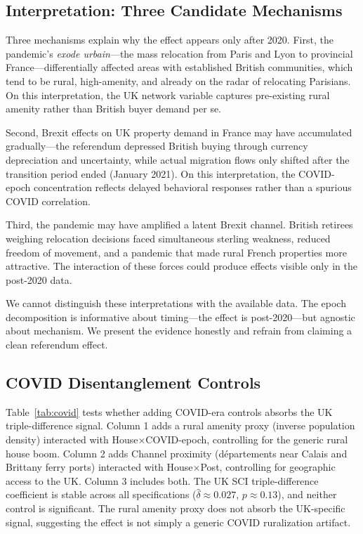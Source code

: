 \documentclass[12pt]{article}
\begin{document}
{\footnotesize}

\subsection{Interpretation: Three Candidate Mechanisms}

Three mechanisms explain why the effect appears only after 2020. First, the pandemic's \textit{exode urbain}---the mass relocation from Paris and Lyon to provincial France---differentially affected areas with established British communities, which tend to be rural, high-amenity, and already on the radar of relocating Parisians. On this interpretation, the UK network variable captures pre-existing rural amenity rather than British buyer demand per se.

Second, Brexit effects on UK property demand in France may have accumulated gradually---the referendum depressed British buying through currency depreciation and uncertainty, while actual migration flows only shifted after the transition period ended (January 2021). On this interpretation, the COVID-epoch concentration reflects delayed behavioral responses rather than a spurious COVID correlation.

Third, the pandemic may have amplified a latent Brexit channel. British retirees weighing relocation decisions faced simultaneous sterling weakness, reduced freedom of movement, and a pandemic that made rural French properties more attractive. The interaction of these forces could produce effects visible only in the post-2020 data.

We cannot distinguish these interpretations with the available data. The epoch decomposition is informative about timing---the effect is post-2020---but agnostic about mechanism. We present the evidence honestly and refrain from claiming a clean referendum effect.

\subsection{COVID Disentanglement Controls}

Table~\ref{tab:covid} tests whether adding COVID-era controls absorbs the UK triple-difference signal. Column 1 adds a rural amenity proxy (inverse population density) interacted with House$\times$COVID-epoch, controlling for the generic rural house boom. Column 2 adds Channel proximity (d\'epartements near Calais and Brittany ferry ports) interacted with House$\times$Post, controlling for geographic access to the UK. Column 3 includes both. The UK SCI triple-difference coefficient is stable across all specifications ($\hat{\delta} \approx 0.027$, $p \approx 0.13$), and neither control is significant. The rural amenity proxy does not absorb the UK-specific signal, suggesting the effect is not simply a generic COVID ruralization artifact.
\end{document}
